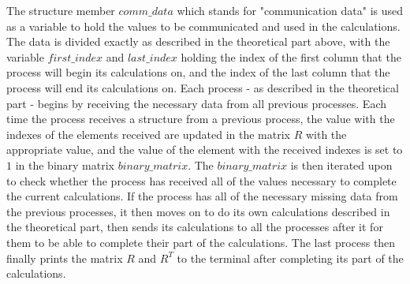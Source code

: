 \documentclass[11pt]{article}
\theoremstyle{definition}
\begin{document}
The structure member $comm\_data$ which stands for "communication data" is used as a variable to hold the values to be communicated and used in the calculations. The data is divided exactly as described in the theoretical part above, with the variable $first\_index$ and $last\_index$ holding the index of the first column that the process will begin its calculations on, and the index of the last column that the process will end its calculations on. Each process - as described in the theoretical part - begins by receiving the necessary data from all previous processes. Each time the process receives a structure from a previous process, the value with the indexes of the elements received are updated in the matrix $R$ with the appropriate value, and the value of the element with the received indexes is set to $1$ in the binary matrix $binary\_matrix$. The $binary\_matrix$ is then iterated upon to check whether the process has received all of the values necessary to complete the current calculations. If the process has all of the necessary missing data from the previous processes, it then moves on to do its own calculations described in the theoretical part, then sends its calculations to all the processes after it for them to be able to complete their part of the calculations. The last process then finally prints the matrix $R$ and $R^T$ to the terminal after completing its part of the calculations.
\end{document}
